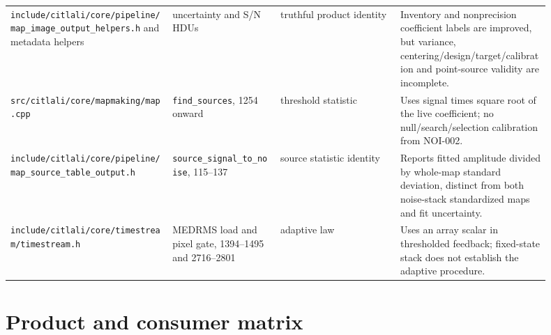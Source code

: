 \documentclass[11pt]{article}
\newcommand{\code}[1]{\nolinkurl{#1}}
\begin{document}
\begin{longtable}{L{0.27\linewidth}L{0.18\linewidth}L{0.20\linewidth}L{0.25\linewidth}}
\code{include/citlali/core/pipeline/map_image_output_helpers.h} and metadata
helpers & uncertainty and S/N HDUs & truthful product identity &
Inventory and nonprecision coefficient labels are improved, but variance,
centering/design/target/calibration and point-source validity are incomplete.\\
\code{src/citlali/core/mapmaking/map.cpp} &
\code{find_sources}, 1254 onward & threshold statistic &
Uses signal times square root of the live coefficient; no null/search/selection
calibration from NOI-002.\\
\code{include/citlali/core/pipeline/map_source_table_output.h} &
\code{source_signal_to_noise}, 115--137 & source statistic identity &
Reports fitted amplitude divided by whole-map standard deviation, distinct
from both noise-stack standardized maps and fit uncertainty.\\
\code{include/citlali/core/timestream/timestream.h} &
MEDRMS load and pixel gate, 1394--1495 and 2716--2801 & adaptive law &
Uses an array scalar in thresholded feedback; fixed-state stack does not
establish the adaptive procedure.\\
\bottomrule
\end{longtable}

\section{Product and consumer matrix}
\end{document}
